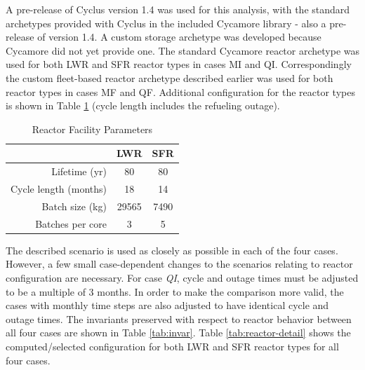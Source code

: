\documentclass{style}
\begin{document}
A pre-release of Cyclus version 1.4 was used for this analysis, with the
standard archetypes provided with Cyclus in the included Cycamore
library - also a pre-release of version 1.4.  A custom storage archetype was
developed because Cycamore did not yet provide one.  The standard Cycamore reactor archetype
was used for both LWR and SFR reactor types in cases MI and QI.  Correspondingly
the custom fleet-based reactor archetype described earlier was used for both reactor
types in cases MF and QF.  Additional configuration for the reactor types is
shown in Table \ref{tab:reactors} (cycle length includes the refueling outage).

\vspace{2mm}

\begin{table}[h]
    \caption{Reactor Facility Parameters}
    \centering
    \begin{tabular}{ |r | c c | }
        \hline                       
            & LWR & SFR \\
        \hline                       
        Lifetime (yr)         & 80 & 80 \\
        Cycle length (months) & 18 & 14 \\  %
        Batch size (kg)       & 29565 & 7490 \\
        Batches per core      & 3 & 5 \\
        \hline                       
    \end{tabular}
    \captionsetup{justification=centering}
    \label{tab:reactors}
\end{table}

The described scenario is used as closely as possible in each of the four
cases.  However, a few small case-dependent changes to the scenarios relating to
reactor configuration are necessary.  For case \emph{QI}, 
cycle and outage times must be adjusted to be a
multiple of 3 months. 
 In order to make the comparison more valid, the cases
with monthly time steps are also adjusted to have identical cycle and outage
times.  The invariants preserved with respect to reactor behavior between all
four cases are shown in Table \ref{tab:invar}.  Table \ref{tab:reactor-detail} shows
the computed/selected configuration for both LWR and SFR reactor types for all
four cases.
\end{document}
